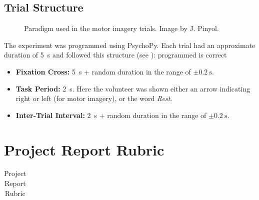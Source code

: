\documentclass[11pt]{exam}
\begin{document}
\begin{appendices}
        \subsection{Trial Structure}
        \begin{figure}[htbp]
            \centering
            \caption{Paradigm used in the motor imagery trials. Image by J. Pinyol.}
            \label{fig:paradigm}
        \end{figure}
        The experiment was programmed using PsychoPy. Each trial had an approximate duration of \SI{5}{\second} and followed this structure (see ): programmed is correct
        \begin{itemize}
            \item \textbf{Fixation Cross:} \SI{5}{\second} + random duration in the range of $\pm\SI{0.2}{\second}$.
            \item \textbf{Task Period:} \SI{2}{\second}. Here the volunteer was shown either an arrow indicating right or left (for motor imagery), or the word \emph{Rest}.
            \item \textbf{Inter-Trial Interval:} \SI{2}{\second} + random duration in the range of $\pm\SI{0.2}{\second}$.
        \end{itemize}

        \clearpage
        \section{Project Report Rubric}
        \label{ann:projectrubric}
        \renewcommand{\arraystretch}{1.5}
        \scriptsize %
        \begin{longtable}{|>{\raggedright\arraybackslash}m{1.8cm}|>{\raggedright\arraybackslash}m{3.1cm}|>{\raggedright\arraybackslash}m{2.5cm}|>{\raggedright\arraybackslash}m{2.7cm}|>{\raggedright\arraybackslash}m{2.1cm}|>{\raggedright\arraybackslash}m{1.5cm}|c|}

            \caption{Project Report Rubric} \\


\end{longtable}
\end{appendices}
\end{document}
